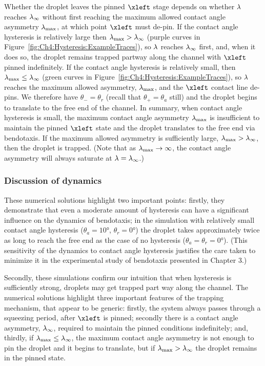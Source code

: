 Whether the droplet leaves the pinned $\xleft$ stage depends on whether $\lambda$ reaches $\lambda_{\infty}$ without first reaching the maximum allowed contact angle asymmetry $\lambda_{\text{max}}$, at which point $\xleft$ must de-pin. If the contact angle hysteresis is relatively large then $\lambda_{\text{max}} > \lambda_{\infty}$ (purple curves in Figure~\ref{fig:Ch4:Hysteresis:ExampleTraces}), so $\lambda$ reaches $\lambda_{\infty}$ first, and, when it does so, the droplet remains trapped partway along the channel with $\xleft$ pinned indefinitely. If the contact angle hysteresis is relatively small, then $\lambda_{\text{max}} \leq \lambda_{\infty}$ (green curves in Figure~\ref{fig:Ch4:Hysteresis:ExampleTraces}), so $\lambda$ reaches the maximum allowed asymmetry, $\lambda_{\text{max}}$, and the $\xleft$ contact line de-pins. We therefore have $\theta_- = \theta_r$ (recall that $\theta_+ = \theta_a$ still) and the droplet begins to translate to the free end of the channel. In summary, when contact angle hysteresis is small, the maximum contact angle asymmetry $\lambda_{\text{max}}$ is insufficient to maintain the pinned $\xleft$ state and the droplet translates to the free end via bendotaxis. If the maximum allowed asymmetry is sufficiently large, $\lambda_{\text{max}} > \lambda_{\infty}$, then the droplet is trapped. (Note that as $\lambda_{\text{max}} \to \infty$, the contact angle asymmetry will always saturate at $\lambda = \lambda_{\infty}$.)



\subsubsection{Discussion of dynamics}
These numerical solutions highlight two important points: firstly, they demonstrate that even a moderate amount of hysteresis can have a significant influence on the dynamics of bendotaxis; in the  simulation with relatively small contact angle hysteresis ($\theta_a =  10\si{\degree}$, $\theta_r =  0\si{\degree}$) the droplet takes approximately twice as long to reach the free end as the case of no hysteresis ($\theta_a =  \theta_r =  0\si{\degree}$). (This sensitivity of the dynamics to contact angle hysteresis justifies the care taken to minimize it in the experimental study of bendotaxis presented in Chapter 3.)

Secondly, these simulations confirm our intuition that when hysteresis is sufficiently strong, droplets may get trapped part way along the channel. The numerical solutions highlight three important features of the trapping mechanism, that appear to be generic:
firstly, the system always passes through a squeezing period, after $\xleft$ is pinned; secondly there is a contact angle asymmetry, $\lambda_{\infty}$, required to maintain the pinned conditions indefinitely; and, thirdly, if $\lambda_{\text{max}} \leq \lambda_{\infty}$, the maximum contact angle asymmetry is not enough to pin the droplet and it begins to translate, but if $\lambda_{\text{max}} > \lambda_{\infty}$ the droplet remains in the pinned state.


